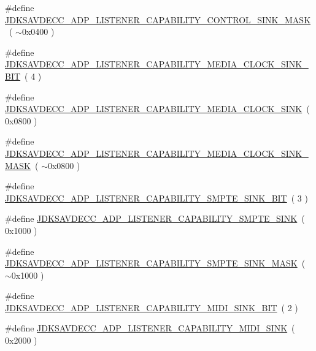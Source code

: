 \begin{DoxyCompactItemize}
\item 
\#define \hyperlink{group__adp__listener__capability_ga17b31b0f0007ea6ded9b8b838f4ef289}{J\+D\+K\+S\+A\+V\+D\+E\+C\+C\+\_\+\+A\+D\+P\+\_\+\+L\+I\+S\+T\+E\+N\+E\+R\+\_\+\+C\+A\+P\+A\+B\+I\+L\+I\+T\+Y\+\_\+\+C\+O\+N\+T\+R\+O\+L\+\_\+\+S\+I\+N\+K\+\_\+\+M\+A\+SK}~( $\sim$0x0400 )
\item 
\#define \hyperlink{group__adp__listener__capability_ga6a9b4feafe1ad0b7d38524e2bc2b76d5}{J\+D\+K\+S\+A\+V\+D\+E\+C\+C\+\_\+\+A\+D\+P\+\_\+\+L\+I\+S\+T\+E\+N\+E\+R\+\_\+\+C\+A\+P\+A\+B\+I\+L\+I\+T\+Y\+\_\+\+M\+E\+D\+I\+A\+\_\+\+C\+L\+O\+C\+K\+\_\+\+S\+I\+N\+K\+\_\+\+B\+IT}~( 4 )
\item 
\#define \hyperlink{group__adp__listener__capability_gaedb053103f2f07279e932d1aec93b618}{J\+D\+K\+S\+A\+V\+D\+E\+C\+C\+\_\+\+A\+D\+P\+\_\+\+L\+I\+S\+T\+E\+N\+E\+R\+\_\+\+C\+A\+P\+A\+B\+I\+L\+I\+T\+Y\+\_\+\+M\+E\+D\+I\+A\+\_\+\+C\+L\+O\+C\+K\+\_\+\+S\+I\+NK}~( 0x0800 )
\item 
\#define \hyperlink{group__adp__listener__capability_gab42b0531876556e296553afba0b577bc}{J\+D\+K\+S\+A\+V\+D\+E\+C\+C\+\_\+\+A\+D\+P\+\_\+\+L\+I\+S\+T\+E\+N\+E\+R\+\_\+\+C\+A\+P\+A\+B\+I\+L\+I\+T\+Y\+\_\+\+M\+E\+D\+I\+A\+\_\+\+C\+L\+O\+C\+K\+\_\+\+S\+I\+N\+K\+\_\+\+M\+A\+SK}~( $\sim$0x0800 )
\item 
\#define \hyperlink{group__adp__listener__capability_ga145dfa99abfbb70b8615a1da91ada06e}{J\+D\+K\+S\+A\+V\+D\+E\+C\+C\+\_\+\+A\+D\+P\+\_\+\+L\+I\+S\+T\+E\+N\+E\+R\+\_\+\+C\+A\+P\+A\+B\+I\+L\+I\+T\+Y\+\_\+\+S\+M\+P\+T\+E\+\_\+\+S\+I\+N\+K\+\_\+\+B\+IT}~( 3 )
\item 
\#define \hyperlink{group__adp__listener__capability_gad895d691e062153da8519c80c42d0036}{J\+D\+K\+S\+A\+V\+D\+E\+C\+C\+\_\+\+A\+D\+P\+\_\+\+L\+I\+S\+T\+E\+N\+E\+R\+\_\+\+C\+A\+P\+A\+B\+I\+L\+I\+T\+Y\+\_\+\+S\+M\+P\+T\+E\+\_\+\+S\+I\+NK}~( 0x1000 )
\item 
\#define \hyperlink{group__adp__listener__capability_ga3dc76c513b89d347ebb4f97339c92968}{J\+D\+K\+S\+A\+V\+D\+E\+C\+C\+\_\+\+A\+D\+P\+\_\+\+L\+I\+S\+T\+E\+N\+E\+R\+\_\+\+C\+A\+P\+A\+B\+I\+L\+I\+T\+Y\+\_\+\+S\+M\+P\+T\+E\+\_\+\+S\+I\+N\+K\+\_\+\+M\+A\+SK}~( $\sim$0x1000 )
\item 
\#define \hyperlink{group__adp__listener__capability_gae419404cabda8b3525ce64ea4844df3a}{J\+D\+K\+S\+A\+V\+D\+E\+C\+C\+\_\+\+A\+D\+P\+\_\+\+L\+I\+S\+T\+E\+N\+E\+R\+\_\+\+C\+A\+P\+A\+B\+I\+L\+I\+T\+Y\+\_\+\+M\+I\+D\+I\+\_\+\+S\+I\+N\+K\+\_\+\+B\+IT}~( 2 )
\item 
\#define \hyperlink{group__adp__listener__capability_ga5ac8b2cdfb49100980ac442752a31ead}{J\+D\+K\+S\+A\+V\+D\+E\+C\+C\+\_\+\+A\+D\+P\+\_\+\+L\+I\+S\+T\+E\+N\+E\+R\+\_\+\+C\+A\+P\+A\+B\+I\+L\+I\+T\+Y\+\_\+\+M\+I\+D\+I\+\_\+\+S\+I\+NK}~( 0x2000 )

\end{DoxyCompactItemize}
